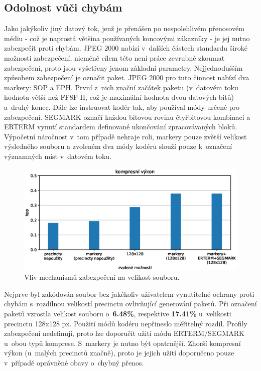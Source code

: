 \subsection*{Odolnost vůči chybám}
Jako jakýkoliv jiný datový tok, jenž je přenášen po nespolehlivém přenosovém médiu - což je naprostá většina používaných koncovými zákazníky - je jej nutno zabezpečit proti chybám. JPEG 2000 nabízí v~dalších částech standardu široké možnosti zabezpečení, nicméně cílem této není práce zevrubně zkoumat zabezpečení, proto jsou vyšetřeny jenom základní parametry. Nejjednodušším způsobem zabezpečení je označit paket. JPEG 2000 pro tuto činnost nabízí dva markery: SOP a EPH. První z~nich znační začátek paketu (v~datovém toku hodnota větší než FF8F H, což je maximální hodnota dvou datových bitů) a~druhý konec. Dále lze instruovat kodér tak, aby používal módy určené pro zabezpečení. SEGMARK označí každou bitovou rovinu čtyřbitovou kombinací a ERTERM vynutí standardem definované ukončování zpracovávaných bloků. Výpočetní náročnost v~tom případě nehraje roli, markery pouze zvětší velikost výsledného souboru a zvoleném dva módy kodéru slouží pouze k~označení významných míst v~datovém toku.

\begin{figure}[hbt!]
  \centering
  \hspace*{-0.75cm}
  \includegraphics[width=16cm]{obrazky-figures/demand/test.eps}
  \caption{Vliv mechanismů zabezpečení na velikost souboru.}
\end{figure}

\noindent Nejprve byl zakódován soubor bez jakékoliv uživatelem vynutitelné ochrany proti chybám s~rozdílnou velikostí precinctu ovlivňující generování paketů. Při označení paketů vzrostla velikost souboru o~\textbf{6.48\%}, respektive \textbf{17.41\%} u~velikosti precinctu 128x128 px. Použití módů kodéru nepřineslo měřitelný rozdíl. Profily zabezpečení nedefinují, proto lze doporučit užití módu ERTERM/SEGMARK u~obou typů komprese. S~markery je nutno být opatrnější. Zhorší kompresní výkon (u~malých precinctů značně), proto je jejich užití doporučeno pouze v~případě oprávněné obavy o~chybný přenos. 
\clearpage

